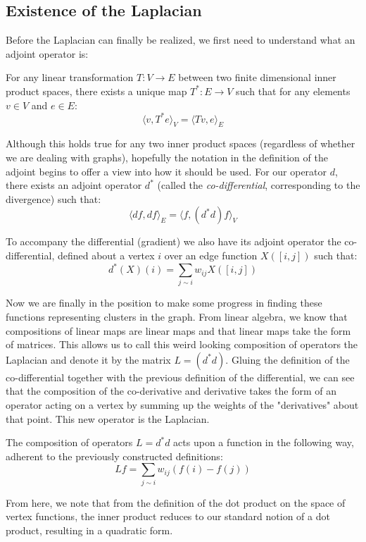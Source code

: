 \subsection{Existence of the Laplacian}
Before the Laplacian can finally be realized, we first need to
understand what an adjoint operator is: 
\begin{definition} 
For any linear transformation \(T: V \rightarrow E\) between two
finite dimensional inner product spaces, there exists a unique map
\(T^*: E \rightarrow V\) such that for any elements \(v \in V\) and
\(e \in E\): 
\[
\langle v, T^*e \rangle_V = \langle Tv, e \rangle_E
\]
\end{definition}
Although this holds true for any two inner product spaces (regardless
of whether we are dealing with graphs), hopefully the notation in the
definition of the adjoint begins to offer a view into how it should be
used. For our operator \(d\), there exists an adjoint operator \(d^*\)
(called the \textit{co-differential}, corresponding to the divergence)
such that: 
\[
\langle df, df \rangle_E = \langle f, (d^*d)f \rangle_V
\]
\begin{definition}
To accompany the differential (gradient) we also have its adjoint
operator the co-differential, defined about a vertex \(i\) over an
edge function \(X([i, j])\) such that: \[d^*(X)(i) = \sum_{j \sim i
}w_{ij}X([i,j])\] 
\end{definition}
Now we are finally in the position to make some progress in finding
these functions representing clusters in the graph. From linear
algebra, we know that compositions of linear maps are linear maps and
that linear maps take the form of matrices. This allows us to call
this weird looking composition of operators the Laplacian and denote
it by the matrix \(L = (d^*d)\). Gluing the definition of the
co-differential together with the previous definition of the
differential, we can see that the composition of the co-derivative and
derivative takes the form of an operator acting on a vertex by summing
up the weights of the "derivatives" about that point. This new
operator is the Laplacian. 
\begin{definition}
The composition of operators \(L = d^*d\) acts upon a function in the
following way, adherent to the previously constructed definitions: \[ 
Lf = \sum_{j \sim i} w_{ij} (f(i) - f(j))\]
\end{definition}
From here, we note that from the definition of the dot product on the
space of vertex functions, the inner product reduces to our standard
notion of a dot product, resulting in a quadratic form. 


